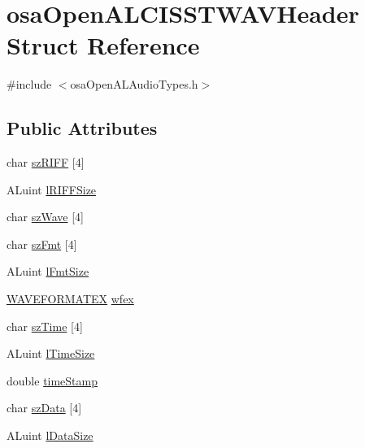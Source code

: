 \hypertarget{structosa_open_a_l_c_i_s_s_t_w_a_v_header}{}\section{osa\+Open\+A\+L\+C\+I\+S\+S\+T\+W\+A\+V\+Header Struct Reference}
\label{structosa_open_a_l_c_i_s_s_t_w_a_v_header}


{\ttfamily \#include $<$osa\+Open\+A\+L\+Audio\+Types.\+h$>$}

\subsection*{Public Attributes}
\begin{DoxyCompactItemize}
\item 
char \hyperlink{structosa_open_a_l_c_i_s_s_t_w_a_v_header_ad204cfd59507548cd8a6c11b83afd9da}{sz\+R\+I\+F\+F} \mbox{[}4\mbox{]}
\item 
A\+Luint \hyperlink{structosa_open_a_l_c_i_s_s_t_w_a_v_header_ae3402f6fcd221cc033bf9e3914e1bcc1}{l\+R\+I\+F\+F\+Size}
\item 
char \hyperlink{structosa_open_a_l_c_i_s_s_t_w_a_v_header_a02f2c36a22eb4d9724059cca34cedb29}{sz\+Wave} \mbox{[}4\mbox{]}
\item 
char \hyperlink{structosa_open_a_l_c_i_s_s_t_w_a_v_header_a1b31e9471642dfe2423300c979d336d0}{sz\+Fmt} \mbox{[}4\mbox{]}
\item 
A\+Luint \hyperlink{structosa_open_a_l_c_i_s_s_t_w_a_v_header_a963147325b34f1313f74ef3475dc4b37}{l\+Fmt\+Size}
\item 
\hyperlink{struct_w_a_v_e_f_o_r_m_a_t_e_x}{W\+A\+V\+E\+F\+O\+R\+M\+A\+T\+E\+X} \hyperlink{structosa_open_a_l_c_i_s_s_t_w_a_v_header_a71f0f631b8d9cb27ef7aea0bc072e170}{wfex}
\item 
char \hyperlink{structosa_open_a_l_c_i_s_s_t_w_a_v_header_abf840e99890224e4da192546e1bf8211}{sz\+Time} \mbox{[}4\mbox{]}
\item 
A\+Luint \hyperlink{structosa_open_a_l_c_i_s_s_t_w_a_v_header_a24ad95377209bb52bd35f716a547daf5}{l\+Time\+Size}
\item 
double \hyperlink{structosa_open_a_l_c_i_s_s_t_w_a_v_header_a50e8ee3dcdfa333af1b637b6e4780924}{time\+Stamp}
\item 
char \hyperlink{structosa_open_a_l_c_i_s_s_t_w_a_v_header_a0a9c145994d6d293b1be775d33414a9e}{sz\+Data} \mbox{[}4\mbox{]}
\item 
A\+Luint \hyperlink{structosa_open_a_l_c_i_s_s_t_w_a_v_header_a9e8875efc234c0d10d3a0315aaddd253}{l\+Data\+Size}
\end{DoxyCompactItemize}


